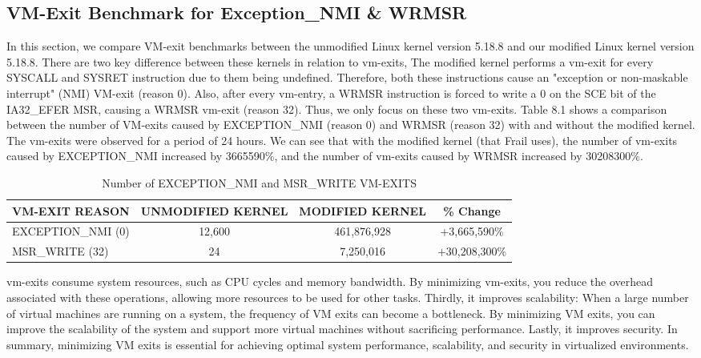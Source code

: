\documentclass{report}
\begin{document}
\begin{spacing}{1.5}
\section{VM-Exit Benchmark for Exception\_NMI \& WRMSR}


{\large
In this section, we compare VM-exit benchmarks between the unmodified Linux kernel version 5.18.8 and our modified Linux kernel version 5.18.8. There are two key difference between these kernels in relation to vm-exits, The modified kernel performs a vm-exit for every SYSCALL and SYSRET instruction due to them being undefined. Therefore, both these instructions cause an "exception or non-maskable interrupt" (NMI) VM-exit (reason 0). Also, after every vm-entry, a WRMSR instruction is forced to write a 0 on the SCE bit of the IA32\_EFER MSR, causing a WRMSR vm-exit (reason 32). Thus, we only focus on these two vm-exits. Table 8.1 shows a comparison between the number of VM-exits caused by EXCEPTION\_NMI (reason 0) and WRMSR (reason 32) with and without the modified kernel. The vm-exits were observed for a period of 24 hours. We can see that with the modified kernel (that Frail uses), the number of vm-exits caused by EXCEPTION\_NMI increased by 3665590\%, and the number of vm-exits caused by WRMSR increased by 30208300\%.
\newline
}


\begin{table}[ht]
\centering
\caption{Number of EXCEPTION\_NMI and MSR\_WRITE VM-EXITS}
\begin{tabular}[t]{lccc}
\hline
VM-EXIT REASON&UNMODIFIED KERNEL&MODIFIED KERNEL&\% Change\\
\hline
EXCEPTION\_NMI (0) &12,600&461,876,928&$+$3,665,590\%\\
MSR\_WRITE (32) & 24 & 7,250,016&$+$30,208,300\%\\
\hline
\end{tabular}
\end{table}%





{\large
\noindent vm-exits consume system resources, such as CPU cycles and memory bandwidth. By minimizing vm-exits, you reduce the overhead associated with these operations, allowing more resources to be used for other tasks. Thirdly, it improves scalability: When a large number of virtual machines are running on a system, the frequency of VM exits can become a bottleneck. By minimizing VM exits, you can improve the scalability of the system and support more virtual machines without sacrificing performance. Lastly, it improves security.  In summary, minimizing VM exits is essential for achieving optimal system performance, scalability, and security in virtualized environments.
\leavevmode\newline
}





\end{spacing}
\end{document}
